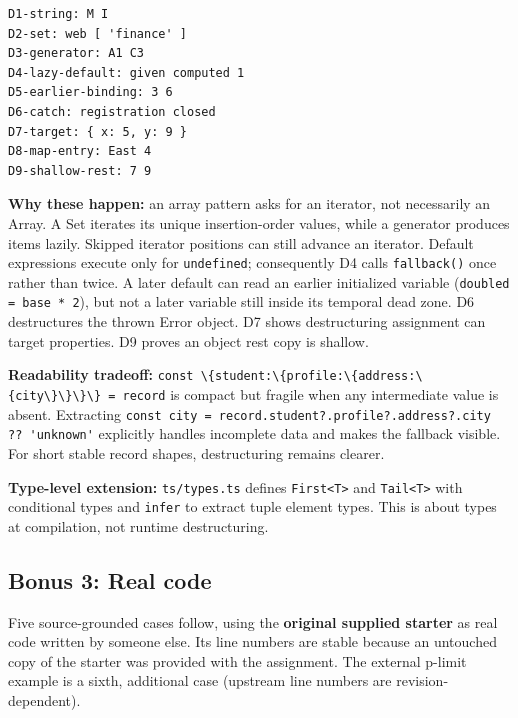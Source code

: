 \documentclass[
  10pt,
]{article}
\newcommand{\passthrough}[1]{#1}
\begin{document}
\begin{lstlisting}
D1-string: M I
D2-set: web [ 'finance' ]
D3-generator: A1 C3
D4-lazy-default: given computed 1
D5-earlier-binding: 3 6
D6-catch: registration closed
D7-target: { x: 5, y: 9 }
D8-map-entry: East 4
D9-shallow-rest: 7 9
\end{lstlisting}

\textbf{Why these happen:} an array pattern asks for an iterator, not
necessarily an Array. A Set iterates its unique insertion-order values,
while a generator produces items lazily. Skipped iterator positions can
still advance an iterator. Default expressions execute only for
\passthrough{\lstinline!undefined!}; consequently D4 calls
\passthrough{\lstinline!fallback()!} once rather than twice. A later
default can read an earlier initialized variable
(\passthrough{\lstinline!doubled = base * 2!}), but not a later variable
still inside its temporal dead zone. D6 destructures the thrown Error
object. D7 shows destructuring assignment can target properties. D9
proves an object rest copy is shallow.

\textbf{Readability tradeoff:}
\passthrough{\lstinline!const \{student:\{profile:\{address:\{city\}\}\}\} = record!}
is compact but fragile when any intermediate value is absent. Extracting
\passthrough{\lstinline!const city = record.student?.profile?.address?.city ?? 'unknown'!}
explicitly handles incomplete data and makes the fallback visible. For
short stable record shapes, destructuring remains clearer.

\textbf{Type-level extension:} \passthrough{\lstinline!ts/types.ts!}
defines \passthrough{\lstinline!First<T>!} and
\passthrough{\lstinline!Tail<T>!} with conditional types and
\passthrough{\lstinline!infer!} to extract tuple element types. This is
about types at compilation, not runtime destructuring.

\subsection{Bonus 3: Real code}\label{bonus-3-real-code}

Five source-grounded cases follow, using the \textbf{original supplied
starter} as real code written by someone else. Its line numbers are
stable because an untouched copy of the starter was provided with the
assignment. The external p-limit example is a sixth, additional case
(upstream line numbers are revision-dependent).
\end{document}
